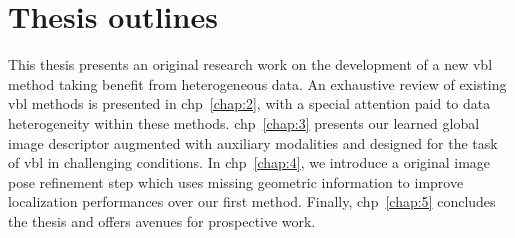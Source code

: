 \section{Thesis outlines}
This thesis presents an original research work on the development of a new \ac{vbl} method taking benefit from heterogeneous data. An exhaustive review of existing \ac{vbl} methods is presented in \acl{chp}~\ref{chap:2}, with a special attention paid to data heterogeneity within these methods. \Ac{chp}~\ref{chap:3} presents our learned global image descriptor augmented with auxiliary modalities and designed for the task of \ac{vbl} in challenging conditions. In \acl{chp}~\ref{chap:4}, we introduce a original image pose refinement step which uses missing geometric information to improve localization performances over our first method. Finally, \ac{chp}~\ref{chap:5} concludes the thesis and offers avenues for prospective work.